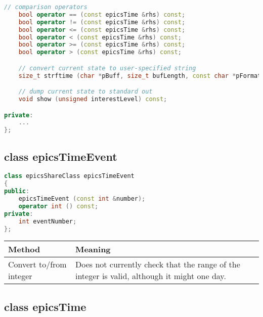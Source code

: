 \begin{lstlisting}[language=C++]
    // comparison operators
    bool operator == (const epicsTime &rhs) const;
    bool operator != (const epicsTime &rhs) const;
    bool operator <= (const epicsTime &rhs) const;
    bool operator < (const epicsTime &rhs) const;
    bool operator >= (const epicsTime &rhs) const;
    bool operator > (const epicsTime &rhs) const;

    // convert current state to user-specified string
    size_t strftime (char *pBuff, size_t bufLength, const char *pFormat) const;

    // dump current state to standard out
    void show (unsigned interestLevel) const;

private:
    ...
};
\end{lstlisting}

\subsection{class epicsTimeEvent}

\begin{lstlisting}[language=C++]
class epicsShareClass epicsTimeEvent
{
public:
    epicsTimeEvent (const int &number);
    operator int () const;
private:
    int eventNumber;
};
\end{lstlisting}
\begin{center}
\begin{longtable}{p{1.79167in}p{4.94833in}}
\textbf{Method} & \textbf{Meaning}\\
\hline
Convert to/from integer & Does not currently check that the range of the integer is valid, although it might one day.
\end{longtable}

\end{center}


\subsection{class epicsTime}

